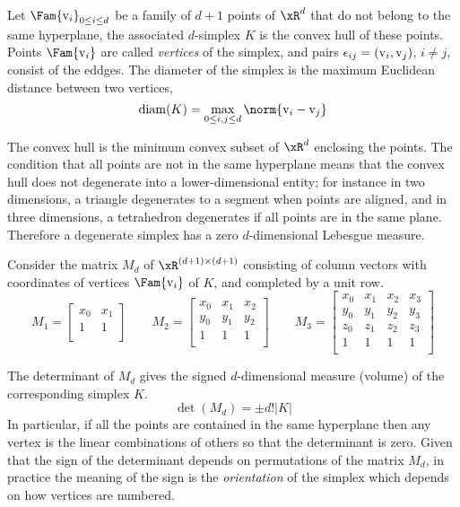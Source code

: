 \begin{dfntn}[Simplex]
Let $\Fam{\vertex_i}_{0\leq i\leq d}$ be a family of $d + 1$ points of $\xR^d$ that do not belong to the same hyperplane, the associated $d$-simplex $K$ is the convex hull of these points.
Points $\Fam{\vertex_i}$ are called \textit{vertices} of the simplex, and pairs $\epsilon_{ij} = ({\mathrm v}_i, {\mathrm v}_j)$, $i\neq j$, consist of the eddges.
The diameter of the simplex is the maximum Euclidean distance between two vertices,
\[
\diam(K) = \displaystyle\max_{0\leq i,j\leq d}\norm{\vertex_i - \vertex_j}
\]
\end{dfntn}

The convex hull is the minimum convex subset of $\xR^d$ enclosing the points.
The condition that all points are not in the same hyperplane means that the convex hull does not degenerate into a lower-dimensional entity; for instance in two dimensions, a triangle degenerates to a segment when points are aligned, and in three dimensions, a tetrahedron degenerates if all points are in the same plane.
Therefore a degenerate simplex has a zero $d$-dimensional Lebesgue measure.

\medskip
Consider the matrix $M_d$ of $\xR^{(d+1)\times(d+1)}$ consisting of column vectors with coordinates of vertices $\Fam{\vertex_i}$ of $K$, and completed by a unit row.
\begin{equation*}
M_1 =
\begin{bmatrix}
x_0 & x_1 \\
1   & 1   \\
\end{bmatrix}
\qquad
M_2 =
\begin{bmatrix}
x_0 & x_1 & x_2 \\
y_0 & y_1 & y_2 \\
1   & 1   & 1   \\
\end{bmatrix}
\qquad
M_3 =
\begin{bmatrix}
x_0 & x_1 & x_2 & x_3 \\
y_0 & y_1 & y_2 & y_3 \\
z_0 & z_1 & z_2 & z_3 \\
1   & 1   & 1   & 1   \\
\end{bmatrix}
\end{equation*}

The determinant of $M_d$ gives the signed $d$-dimensional measure (volume) of the corresponding simplex $K$.
\begin{equation*}
\det(M_d) = \pm d! |K|
\end{equation*}
In particular, if all the points are contained in the same hyperplane then any vertex is the linear combinations of others so that the determinant is zero.
Given that the sign of the determinant depends on permutations of the matrix $M_d$, in practice the meaning of the sign is the \textit{orientation} of the simplex which depends on how vertices are numbered.


